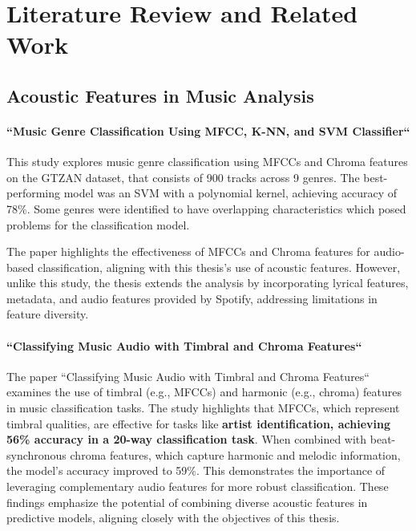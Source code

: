 \chapter{Literature Review and Related Work}
\label{cha:literaturereview}


\section{Acoustic Features in Music Analysis}
\label{sec:acousticfeaturesinmusicanalysis}

\subsubsection*{``Music Genre Classification Using MFCC, K-NN, and SVM
Classifier``}


\cite{music_genre_classification_mfcc} This study explores music genre classification using MFCCs and Chroma features
on the GTZAN dataset, that consists of 900 tracks across 9 genres. The
best-performing model was an SVM with a polynomial kernel, achieving accuracy
of 78\%. Some genres were identified to have overlapping characteristics which
posed problems for the classification model.

The paper highlights the effectiveness of MFCCs and Chroma features for
audio-based classification, aligning with this thesis's use of acoustic
features. However, unlike this study, the thesis extends the analysis by
incorporating lyrical features, metadata, and audio features provided by
Spotify, addressing limitations in feature diversity.

\subsubsection*{``Classifying Music Audio with Timbral and Chroma Features``}
\cite{classifying_music_audio}
The paper ``Classifying Music Audio with Timbral and Chroma Features`` examines
the use of timbral (e.g., MFCCs) and harmonic (e.g., chroma) features in music
classification tasks. The study highlights that MFCCs, which represent timbral
qualities, are effective for tasks like \textbf{artist identification, achieving 56\%
accuracy in a 20-way classification task}. When combined with beat-synchronous
chroma features, which capture harmonic and melodic information, the model's
accuracy improved to 59\%. This demonstrates the importance of leveraging
complementary audio features for more robust classification. These findings
emphasize the potential of combining diverse acoustic features in predictive
models, aligning closely with the objectives of this thesis.



